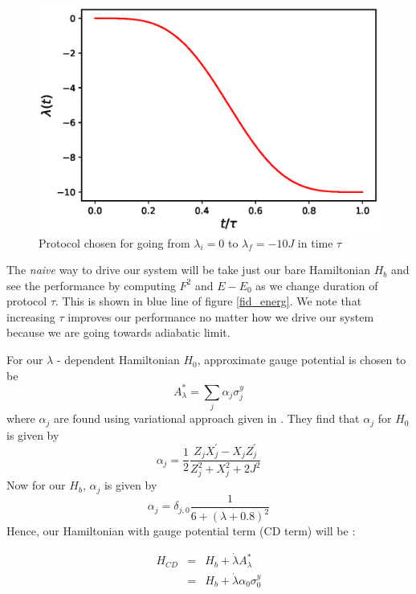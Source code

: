 \documentclass[11pt,a4paper]{article}
\begin{document}
\begin{figure}
\centering
\includegraphics[scale=0.67]{protocol.eps}
\caption{Protocol chosen for going from $\lambda_i=0$ to $\lambda_f=-10J$ in time $\tau$}
\label{protocol_figure}
\end{figure}

The \textit{naive} way to drive our system will be take just our bare Hamiltonian $H_b$ and see the performance by computing $F^2$ and $E-E_0$ as we change duration of protocol $\tau$. This is shown in blue line of figure \ref{fid_energ}. We note that increasing $\tau$ improves our performance no matter how we drive our system because we are going towards adiabatic limit.


For our $\lambda$ - dependent  Hamiltonian $H_0$, approximate gauge potential is chosen to be 
\begin{equation}
A_{\lambda}^*= \sum_j \alpha_j \sigma_j^y
\end{equation}
where $\alpha_j$ are found using variational approach given in \cite{sels2017minimizing}. They find that $\alpha_j$ for $H_0$ is given by 
\begin{equation}
\alpha_j= \dfrac{1}{2} \dfrac{Z_j X_j^{\prime}- X_j Z_j^{\prime}}{Z_j^2 + X_j^2 +2J^2}
\end{equation}
Now for our $H_b$, $\alpha_j$ is given by 
\begin{equation}
\alpha_j= \delta_{j,0} \dfrac{1}{6 + (\lambda +0.8)^2}
\end{equation}
Hence, our  Hamiltonian with gauge potential term (CD term)  will be :


\begin{eqnarray}
H_{CD}&=&H_b + \dot{\lambda} A_{\lambda}^* \\
&=&H_b + \dot{\lambda} \alpha_0 \sigma_0^y 
\end{eqnarray}
\end{document}
